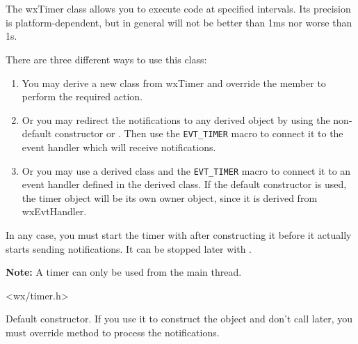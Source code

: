 \section{}\label{wxtimer}

The wxTimer class allows you to execute code at specified intervals. Its
precision is platform-dependent, but in general will not be better than 1ms nor
worse than 1s.

There are three different ways to use this class:

\begin{enumerate}
\item You may derive a new class from wxTimer and override the 
 member to perform the required action.
\item Or you may redirect the notifications to any 
 derived object by using the non-default
constructor or . Then use the {\tt EVT\_TIMER} 
macro to connect it to the event handler which will receive 
 notifications.
\item Or you may use a derived class and the {\tt EVT\_TIMER} 
macro to connect it to an event handler defined in the derived class.
If the default constructor is used, the timer object will be its
own owner object, since it is derived from wxEvtHandler.
\end{enumerate}

In any case, you must start the timer with  
after constructing it before it actually starts sending notifications. It can
be stopped later with .

{\bf Note:} A timer can only be used from the main thread.




<wx/timer.h>




\label{wxtimerwxtimer}


Default constructor. If you use it to construct the object and don't call 
 later, you must override 
 method to process the notifications.

